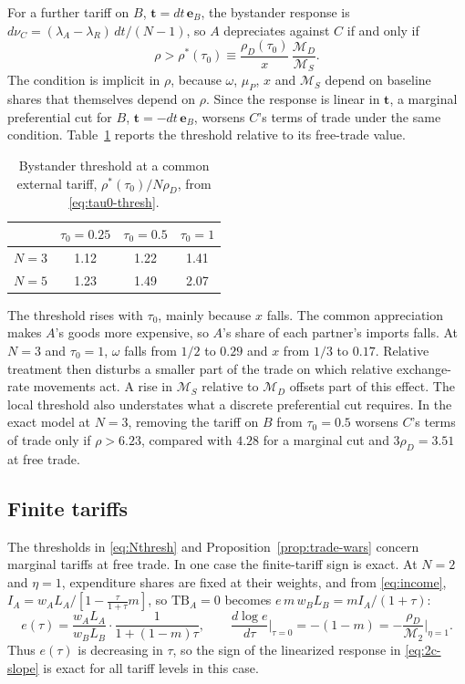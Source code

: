 \documentclass[11pt]{article}
\begin{document}
For a further tariff on $B$, $\mathbf t=dt\,\mathbf e_B$, the bystander response is $d\nu_C=(\lambda_A-\lambda_R)\,dt/(N-1)$, so $A$ depreciates against $C$ if and only if
\begin{equation}
\rho>\rho^\ast(\tau_0)\equiv\frac{\rho_D(\tau_0)}{x}\,\frac{\mathcal M_D}{\mathcal M_S}.
\label{eq:tau0-thresh}
\end{equation}
The condition is implicit in $\rho$, because $\omega$, $\mu_P$, $x$ and $\mathcal M_S$ depend on baseline shares that themselves depend on $\rho$. Since the response is linear in $\mathbf t$, a marginal preferential cut for $B$, $\mathbf t=-dt\,\mathbf e_B$, worsens $C$'s terms of trade under the same condition. Table~\ref{tab:tau0} reports the threshold relative to its free-trade value.

\begin{table}[htbp]
\centering
\begin{tabular}{lccc}
\toprule
 & $\tau_0=0.25$ & $\tau_0=0.5$ & $\tau_0=1$ \\
\midrule
$N=3$ & 1.12 & 1.22 & 1.41 \\
$N=5$ & 1.23 & 1.49 & 2.07 \\
\bottomrule
\end{tabular}
\caption{Bystander threshold at a common external tariff, $\rho^\ast(\tau_0)/N\rho_D$, from \eqref{eq:tau0-thresh}.}
\label{tab:tau0}
\end{table}

The threshold rises with $\tau_0$, mainly because $x$ falls. The common appreciation makes $A$'s goods more expensive, so $A$'s share of each partner's imports falls. At $N=3$ and $\tau_0=1$, $\omega$ falls from $1/2$ to $0.29$ and $x$ from $1/3$ to $0.17$. Relative treatment then disturbs a smaller part of the trade on which relative exchange-rate movements act. A rise in $\mathcal M_S$ relative to $\mathcal M_D$ offsets part of this effect. The local threshold also understates what a discrete preferential cut requires. In the exact model at $N=3$, removing the tariff on $B$ from $\tau_0=0.5$ worsens $C$'s terms of trade only if $\rho>6.23$, compared with $4.28$ for a marginal cut and $3\rho_D=3.51$ at free trade.

\subsection{Finite tariffs}
\label{app:asym-finite}

The thresholds in \eqref{eq:Nthresh} and Proposition~\ref{prop:trade-wars} concern marginal tariffs at free trade. In one case the finite-tariff sign is exact. At $N=2$ and $\eta=1$, expenditure shares are fixed at their weights, and from \eqref{eq:income}, $I_A = w_A L_A/[1 - \tfrac{\tau}{1+\tau}m]$, so $\mathrm{TB}_A = 0$ becomes $e\,m\,w_B L_B = m I_A/(1+\tau)$:
\begin{equation}
e(\tau) = \frac{w_A L_A}{w_B L_B}\cdot \frac{1}{1 + (1-m)\tau},
\qquad
\frac{d\log e}{d\tau}\bigg|_{\tau=0} = -(1-m) = -\frac{\rho_D}{\mathcal M_2}\bigg|_{\eta=1}.
\end{equation}
Thus $e(\tau)$ is decreasing in $\tau$, so the sign of the linearized response in \eqref{eq:2c-slope} is exact for all tariff levels in this case.
\end{document}
